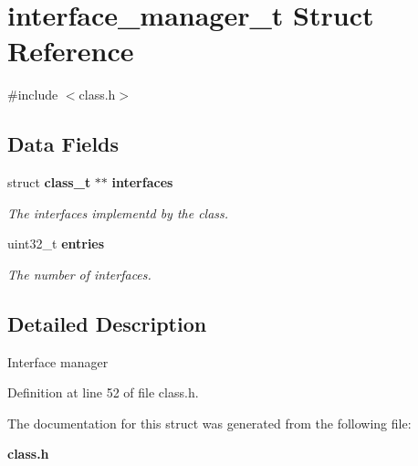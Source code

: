 \section{interface\_\-manager\_\-t Struct Reference}
\label{structinterface__manager__t}


{\ttfamily \#include $<$class.h$>$}

\subsection*{Data Fields}
\begin{DoxyCompactItemize}
\item 
struct {\bf class\_\-t} $\ast$$\ast$ {\bf interfaces}\label{structinterface__manager__t_a91f9abcf42c2acb6da515afc231bcdcd}

\begin{DoxyCompactList}\small\item\em The interfaces implementd by the class. \item\end{DoxyCompactList}\item 
uint32\_\-t {\bf entries}\label{structinterface__manager__t_a638bfd4f9d42b4ebf31d6c83d92cc313}

\begin{DoxyCompactList}\small\item\em The number of interfaces. \item\end{DoxyCompactList}\end{DoxyCompactItemize}


\subsection{Detailed Description}
Interface manager 

Definition at line 52 of file class.h.



The documentation for this struct was generated from the following file:\begin{DoxyCompactItemize}
\item 
{\bf class.h}\end{DoxyCompactItemize}
